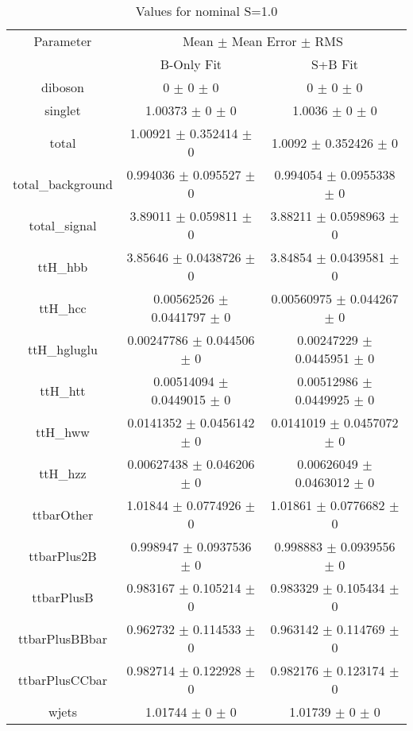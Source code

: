 \begin{table}
\centering
\caption{Values for nominal S=1.0}
\begin{tabular}{ccc}
\toprule
Parameter & \multicolumn{2}{c}{Mean $\pm$ Mean Error $\pm$ RMS}\\
 & B-Only Fit & S+B Fit\\
\midrule
diboson & \num{0} $\pm$ \num{0} $\pm$ \num{0} & \num{0} $\pm$ \num{0} $\pm$ \num{0}\\
singlet & \num{1.00373} $\pm$ \num{0} $\pm$ \num{0} & \num{1.0036} $\pm$ \num{0} $\pm$ \num{0}\\
total & \num{1.00921} $\pm$ \num{0.352414} $\pm$ \num{0} & \num{1.0092} $\pm$ \num{0.352426} $\pm$ \num{0}\\
total\_background & \num{0.994036} $\pm$ \num{0.095527} $\pm$ \num{0} & \num{0.994054} $\pm$ \num{0.0955338} $\pm$ \num{0}\\
total\_signal & \num{3.89011} $\pm$ \num{0.059811} $\pm$ \num{0} & \num{3.88211} $\pm$ \num{0.0598963} $\pm$ \num{0}\\
ttH\_hbb & \num{3.85646} $\pm$ \num{0.0438726} $\pm$ \num{0} & \num{3.84854} $\pm$ \num{0.0439581} $\pm$ \num{0}\\
ttH\_hcc & \num{0.00562526} $\pm$ \num{0.0441797} $\pm$ \num{0} & \num{0.00560975} $\pm$ \num{0.044267} $\pm$ \num{0}\\
ttH\_hgluglu & \num{0.00247786} $\pm$ \num{0.044506} $\pm$ \num{0} & \num{0.00247229} $\pm$ \num{0.0445951} $\pm$ \num{0}\\
ttH\_htt & \num{0.00514094} $\pm$ \num{0.0449015} $\pm$ \num{0} & \num{0.00512986} $\pm$ \num{0.0449925} $\pm$ \num{0}\\
ttH\_hww & \num{0.0141352} $\pm$ \num{0.0456142} $\pm$ \num{0} & \num{0.0141019} $\pm$ \num{0.0457072} $\pm$ \num{0}\\
ttH\_hzz & \num{0.00627438} $\pm$ \num{0.046206} $\pm$ \num{0} & \num{0.00626049} $\pm$ \num{0.0463012} $\pm$ \num{0}\\
ttbarOther & \num{1.01844} $\pm$ \num{0.0774926} $\pm$ \num{0} & \num{1.01861} $\pm$ \num{0.0776682} $\pm$ \num{0}\\
ttbarPlus2B & \num{0.998947} $\pm$ \num{0.0937536} $\pm$ \num{0} & \num{0.998883} $\pm$ \num{0.0939556} $\pm$ \num{0}\\
ttbarPlusB & \num{0.983167} $\pm$ \num{0.105214} $\pm$ \num{0} & \num{0.983329} $\pm$ \num{0.105434} $\pm$ \num{0}\\
ttbarPlusBBbar & \num{0.962732} $\pm$ \num{0.114533} $\pm$ \num{0} & \num{0.963142} $\pm$ \num{0.114769} $\pm$ \num{0}\\
ttbarPlusCCbar & \num{0.982714} $\pm$ \num{0.122928} $\pm$ \num{0} & \num{0.982176} $\pm$ \num{0.123174} $\pm$ \num{0}\\
wjets & \num{1.01744} $\pm$ \num{0} $\pm$ \num{0} & \num{1.01739} $\pm$ \num{0} $\pm$ \num{0}\\
\bottomrule
\end{tabular}
\end{table}